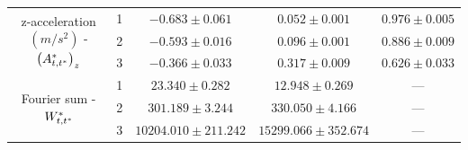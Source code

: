 \begin{table}[ht]
{\begin{tabular}{ccccc}
    \multirow{3}{*}{z-acceleration $(m/s^2)$ - $\left(A^*_{t,t^*}\right)_z$} & 1                                    & $-0.683 \pm 0.061$ & $0.052 \pm 0.001$ & $0.976 \pm 0.005$ \\
                                                                                   & 2                                    & $-0.593 \pm 0.016$ & $0.096 \pm 0.001$ & $0.886 \pm 0.009$ \\
                                                                                   & 3                                    & $-0.366 \pm 0.033$ & $0.317 \pm 0.009$ & $0.626 \pm 0.033$ \\ \hline
    \multirow{3}{*}{Fourier sum - $W^*_{t,t^*}$}                                      & 1                                    & $23.340 \pm 0.282$ & $12.948 \pm 0.269$ & ---             \\
                                                                                   & 2                                    & $301.189 \pm 3.244$ & $330.050 \pm 4.166$ & ---             \\
                                                                                   & 3                                    & $10204.010 \pm 211.242$ & $15299.066 \pm 352.674$ & ---             \\ \hline
    \end{tabular}
    }
    \label{table:emis_dists_CarHHMM-DFT}
\end{table}

